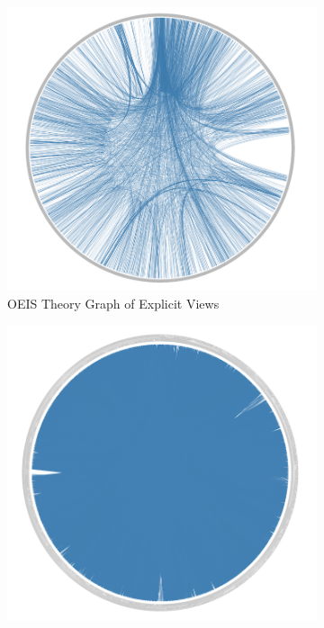 \begin{figure}[!h]
\begin{subfigure}{0.3\textwidth}
\centerline{\includegraphics[scale=0.2]{before}}
\caption{OEIS Theory Graph of Explicit Views \label{fig:before}}
\end{subfigure}
\begin{subfigure}{0.3\textwidth}
\centerline{\includegraphics[scale=0.22]{after}}

\end{subfigure}
\end{figure}
